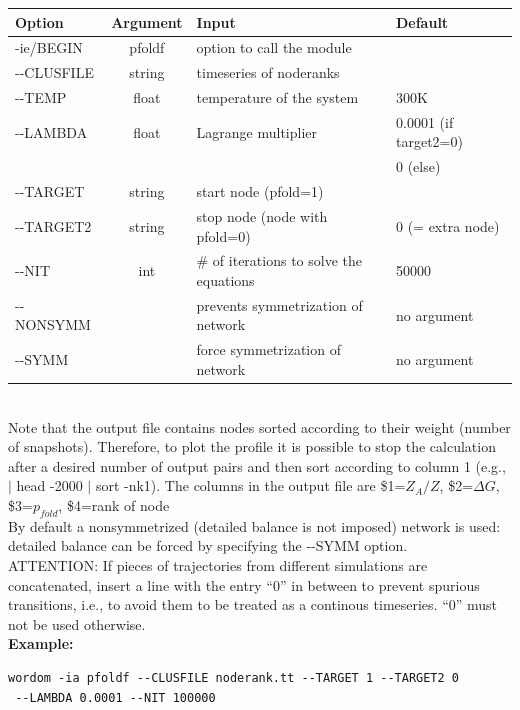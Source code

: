 \documentclass[11pt,twoside,onecolumn,a4paper,openright,notitlepage]{book}[2001/04/21]
\begin{document}
\begin{tabular}{l|c|l|l}
Option & Argument & Input&Default \\
\hline
-ie/BEGIN    & pfoldf & option to call the module &\\
-{}-CLUSFILE & string & timeseries of noderanks & \\
-{}-TEMP     & float  & temperature of the system & 300K \\
-{}-LAMBDA   & float  & Lagrange multiplier & 0.0001 (if target2=0) \\ 
 &&&0 (else) \\
-{}-TARGET   & string & start node (pfold=1) \\
-{}-TARGET2  & string & stop node (node with pfold=0) & 0 (= extra node) \\
-{}-NIT      & int    &  \# of iterations to solve the equations &  50000\\
-{}-NONSYMM  &        &  prevents symmetrization of network & no argument\\
-{}-SYMM     &        &  force symmetrization of network & no argument\\
\end{tabular}\\

\noindent Note that the output file contains nodes sorted according to their weight (number of snapshots). Therefore, to plot the profile it is possible to stop the calculation after a desired number of output pairs and then sort according to column 1 (e.g., $\mid$ head -2000 $\mid$ sort -nk1). The columns in the output file are \$1=$Z_{A}/Z$, \$2=$\Delta{}G$, \$3=$p_{fold}$, \$4=rank of node\\

\noindent By default a nonsymmetrized (detailed balance is not imposed) network is used: detailed balance can be forced by specifying the -{}-SYMM option.\\

\noindent ATTENTION: If pieces of trajectories from different simulations are concatenated, insert a line with the entry ``0'' in between to prevent spurious transitions, i.e., to avoid them to be treated as a continous timeseries. ``0'' must not be used otherwise.\\

{\bf Example:}

\begin{verbatim}wordom -ia pfoldf --CLUSFILE noderank.tt --TARGET 1 --TARGET2 0
 --LAMBDA 0.0001 --NIT 100000 \end{verbatim}
\end{document}
